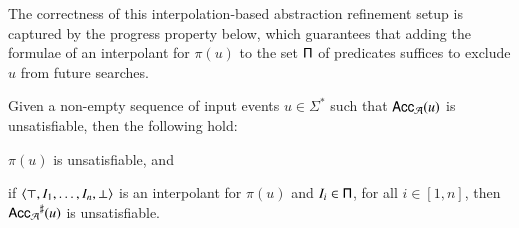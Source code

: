 \documentclass{llncs}
\begin{document}
The correctness of this interpolation-based abstraction refinement
setup is captured by the progress property below, which guarantees
that adding the formulae of an interpolant for $\pi(u)$ to the set
$\mathsf{\Pi}$ of predicates suffices to exclude $u$ from future searches.

\begin{lemma}\label{lemma:progress}
  Given a non-empty sequence of input events $u \in \Sigma^*$ such
  that $\mathsf{Acc}_{\mathcal{A}}(u)$ is unsatisfiable, then the following
  hold: \begin{compactenum}
  \item\label{it1:progress} $\pi(u)$ is unsatisfiable, and
  \item\label{it2:progress} if $\left\langle \top,I_1,\dots,I_n,\bot \right\rangle$ is an
    interpolant for $\pi(u)$ and $I_i \in \mathsf{\Pi}$, for all
    $i\in[1,n]$, then ${\mathsf{Acc}_{\mathcal{A}}}^\sharp(u)$ is unsatisfiable.
  \end{compactenum}
\end{lemma}
\proof{
  
\qed}

 

\end{document}
